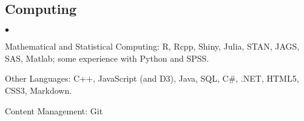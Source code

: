 \documentclass[margin,line]{res}
\newenvironment{list2}{
  \begin{list}{$\bullet$}{%
      \setlength{\itemsep}{0in}
      \setlength{\parsep}{0in} \setlength{\parskip}{0in}
      \setlength{\topsep}{0in} \setlength{\partopsep}{0in}
      \setlength{\leftmargin}{0.2in}}}{\end{list}}
\begin{document}
\begin{resume}

\section{\sc Computing}
\begin{list2}
\item Mathematical and Statistical Computing:  R, Rcpp, Shiny, Julia, STAN, JAGS, SAS, Matlab; some experience  with Python and SPSS.
\item Other Languages: C++, JavaScript (and D3), Java, SQL, C\#, .NET, HTML5, CSS3, Markdown.
\item Content Management: Git
\end{list2}











\end{resume}
\end{document}
